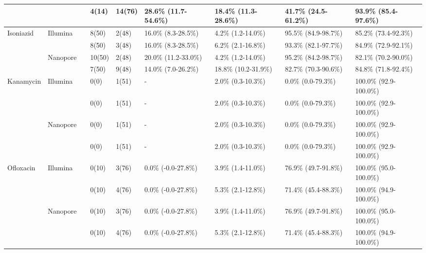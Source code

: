 \begin{table}
{\begin{tabular}{|l|l|l|l|l|l|l|l|l|}
 &
   &
  \mykrobe{} &
  4(14) &
  14(76) &
  28.6\% (11.7-54.6\%) &
  18.4\% (11.3-28.6\%) &
  41.7\% (24.5-61.2\%) &
  93.9\% (85.4-97.6\%) \\ \hline
\multirow{4}{*}{Isoniazid} &
  \multirow{2}{*}{Illumina} &
  \drprg{} &
  8(50) &
  2(48) &
  16.0\% (8.3-28.5\%) &
  4.2\% (1.2-14.0\%) &
  95.5\% (84.9-98.7\%) &
  85.2\% (73.4-92.3\%) \\ \cline{3-9} 
 &
   &
  \mykrobe{} &
  8(50) &
  3(48) &
  16.0\% (8.3-28.5\%) &
  6.2\% (2.1-16.8\%) &
  93.3\% (82.1-97.7\%) &
  84.9\% (72.9-92.1\%) \\ \cline{2-9} 
 &
  \multirow{2}{*}{Nanopore} &
  \drprg{} &
  10(50) &
  2(48) &
  20.0\% (11.2-33.0\%) &
  4.2\% (1.2-14.0\%) &
  95.2\% (84.2-98.7\%) &
  82.1\% (70.2-90.0\%) \\ \cline{3-9} 
 &
   &
  \mykrobe{} &
  7(50) &
  9(48) &
  14.0\% (7.0-26.2\%) &
  18.8\% (10.2-31.9\%) &
  82.7\% (70.3-90.6\%) &
  84.8\% (71.8-92.4\%) \\ \hline
\multirow{4}{*}{Kanamycin} &
  \multirow{2}{*}{Illumina} &
  \drprg{} &
  0(0) &
  1(51) &
  - &
  2.0\% (0.3-10.3\%) &
  0.0\% (0.0-79.3\%) &
  100.0\% (92.9-100.0\%) \\ \cline{3-9} 
 &
   &
  \mykrobe{} &
  0(0) &
  1(51) &
  - &
  2.0\% (0.3-10.3\%) &
  0.0\% (0.0-79.3\%) &
  100.0\% (92.9-100.0\%) \\ \cline{2-9} 
 &
  \multirow{2}{*}{Nanopore} &
  \drprg{} &
  0(0) &
  1(51) &
  - &
  2.0\% (0.3-10.3\%) &
  0.0\% (0.0-79.3\%) &
  100.0\% (92.9-100.0\%) \\ \cline{3-9} 
 &
   &
  \mykrobe{} &
  0(0) &
  1(51) &
  - &
  2.0\% (0.3-10.3\%) &
  0.0\% (0.0-79.3\%) &
  100.0\% (92.9-100.0\%) \\ \hline
\multirow{4}{*}{Ofloxacin} &
  \multirow{2}{*}{Illumina} &
  \drprg{} &
  0(10) &
  3(76) &
  0.0\% (-0.0-27.8\%) &
  3.9\% (1.4-11.0\%) &
  76.9\% (49.7-91.8\%) &
  100.0\% (95.0-100.0\%) \\ \cline{3-9} 
 &
   &
  \mykrobe{} &
  0(10) &
  4(76) &
  0.0\% (-0.0-27.8\%) &
  5.3\% (2.1-12.8\%) &
  71.4\% (45.4-88.3\%) &
  100.0\% (94.9-100.0\%) \\ \cline{2-9} 
 &
  \multirow{2}{*}{Nanopore} &
  \drprg{} &
  0(10) &
  3(76) &
  0.0\% (-0.0-27.8\%) &
  3.9\% (1.4-11.0\%) &
  76.9\% (49.7-91.8\%) &
  100.0\% (95.0-100.0\%) \\ \cline{3-9} 
 &
   &
  \mykrobe{} &
  0(10) &
  4(76) &
  0.0\% (-0.0-27.8\%) &
  5.3\% (2.1-12.8\%) &
  71.4\% (45.4-88.3\%) &
  100.0\% (94.9-100.0\%) \\ \hline

\end{tabular}}
\end{table}
